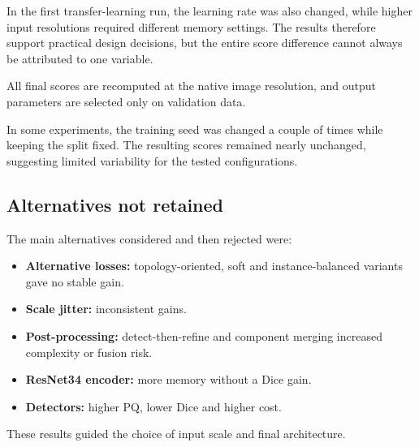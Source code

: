 In the first transfer-learning run, the learning rate was also changed, while higher
input resolutions required different
memory settings. The results therefore support practical design decisions, but the
entire score difference cannot always be attributed to one variable.

All final scores are recomputed at the native image resolution, and output parameters
are selected only on validation data.

In some experiments, the training seed was changed a couple of times while keeping the
split fixed. The resulting scores remained nearly unchanged, suggesting limited
variability for the tested configurations.

\subsection{Alternatives not retained}

The main alternatives considered and then rejected were:

\begin{itemize}
\setlength{\itemsep}{0.1em}
\item \textbf{Alternative losses:} topology-oriented, soft and instance-balanced variants gave no stable gain.
\item \textbf{Scale jitter:} inconsistent gains.
\item \textbf{Post-processing:} detect-then-refine and component merging increased complexity or fusion risk.
\item \textbf{ResNet34 encoder:} more memory without a Dice gain.
\item \textbf{Detectors:} higher PQ, lower Dice and higher cost.
\end{itemize}

These results guided the choice of input scale and final architecture.
